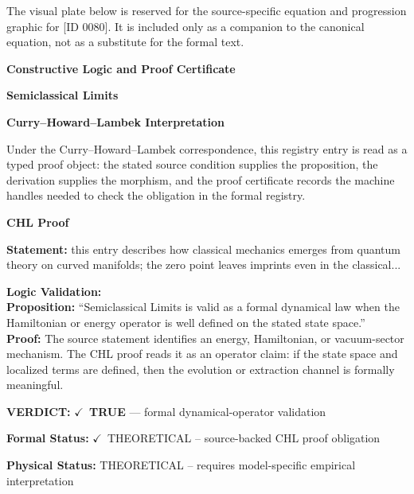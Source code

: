 \begingroup\footnotesize\sloppy
The visual plate below is reserved for the source-specific equation and progression graphic for [ID 0080]. It is included only as a companion to the canonical equation, not as a substitute for the formal text.
\par\endgroup
\ifTZPDarkEdition
{}
\fi

\clearpage
\begingroup\tzpsupportsetup
\noindent\textbf{\fontsize{10.8pt}{12.8pt}\selectfont [ID 0080] Constructive Logic and Proof Certificate}\par
\noindent\textbf{\fontsize{10pt}{12pt}\selectfont Semiclassical Limits}\par
\vspace{0.45em}
\begingroup
\footnotesize
\setlength{\parskip}{0.22em}
\setlength{\parindent}{0pt}
\noindent\textbf{Curry--Howard--Lambek Interpretation}\par
Under the Curry--Howard--Lambek correspondence, this registry entry is read as a typed proof
object: the stated source condition supplies the proposition, the derivation supplies the
morphism, and the proof certificate records the machine handles needed to check the obligation
in the formal registry.

\vspace{0.45em}
\noindent\textbf{CHL Proof}\par
\textbf{Statement:} this entry describes how classical mechanics emerges from quantum theory on curved
manifolds; the zero point leaves imprints even in the classical...

\textbf{Logic Validation:}\\
\textbf{Proposition:} ``Semiclassical Limits is valid as a formal dynamical law when the Hamiltonian or energy
operator is well defined on the stated state space.''\\
\textbf{Proof:} The source statement identifies an energy, Hamiltonian, or vacuum-sector mechanism. The
CHL proof reads it as an operator claim: if the state space and localized terms are
defined, then the evolution or extraction channel is formally meaningful.

\textbf{VERDICT:} \ensuremath{\checkmark}\ \textbf{TRUE} --- formal dynamical-operator validation

\textbf{Formal Status:} \ensuremath{\checkmark}\ THEORETICAL -- source-backed CHL proof obligation

\textbf{Physical Status:} THEORETICAL -- requires model-specific empirical interpretation
\par\vspace{0.45em}
\par
\ifTZPDarkEdition
{}
\fi
\endgroup
\endgroup
